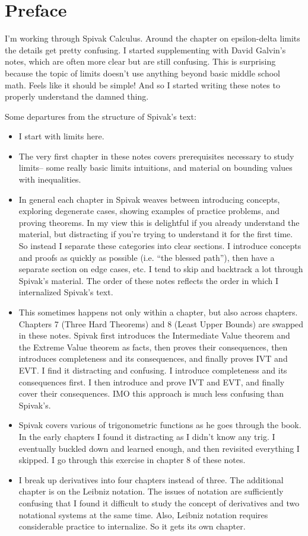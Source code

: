 
\section{Preface}

I'm working through Spivak Calculus. Around the chapter on
epsilon-delta limits the details get pretty confusing. I started
supplementing with David Galvin's notes, which are often more clear
but are still confusing. This is surprising because the topic of
limits doesn't use anything beyond basic middle school math. Feels
like it should be simple! And so I started writing these notes to
properly understand the damned thing.

\vs

Some departures from the structure of Spivak's text:
\begin{itemize}
\item I start with limits here.
\item The very first chapter in these notes covers prerequisites
  necessary to study limits-- some really basic limits intuitions, and
  material on bounding values with inequalities.
\item In general each chapter in Spivak weaves between introducing
  concepts, exploring degenerate cases, showing examples of practice
  problems, and proving theorems. In my view this is delightful if you
  already understand the material, but distracting if you're trying to
  understand it for the first time. So instead I separate these
  categories into clear sections. I introduce concepts and proofs as
  quickly as possible (i.e. ``the blessed path''), then have a
  separate section on edge cases, etc. I tend to skip and backtrack a
  lot through Spivak's material. The order of these notes reflects the
  order in which I internalized Spivak's text.
\item This sometimes happens not only within a chapter, but also
  across chapters. Chapters 7 (Three Hard Theorems) and 8 (Least Upper
  Bounds) are swapped in these notes. Spivak first introduces the
  Intermediate Value theorem and the Extreme Value theorem as facts,
  then proves their consequences, then introduces completeness and its
  consequences, and finally proves IVT and EVT. I find it distracting
  and confusing. I introduce completeness and its consequences first.
  I then introduce and prove IVT and EVT, and finally cover their
  consequences. IMO this approach is much less confusing than
  Spivak's.
\item Spivak covers various of trigonometric functions as he goes
  through the book. In the early chapters I found it distracting as I
  didn't know any trig. I eventually buckled down and learned enough,
  and then revisited everything I skipped. I go through this exercise
  in chapter 8 of these notes.
\item I break up derivatives into four chapters instead of three. The
  additional chapter is on the Leibniz notation. The issues of
  notation are sufficiently confusing that I found it difficult to
  study the concept of derivatives and two notational systems at the
  same time. Also, Leibniz notation requires considerable practice to
  internalize. So it gets its own chapter.
\end{itemize}



